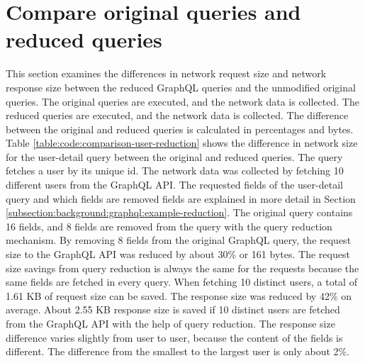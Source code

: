 \section{Compare original queries and reduced queries}

This section examines the differences in network request size and network response size between the reduced GraphQL queries and the unmodified original queries. The original queries are executed, and the network data is collected. The reduced queries are executed, and the network data is collected. The difference between the original and reduced queries is calculated in percentages and bytes. Table \ref{table:code:comparison-user-reduction} shows the difference in network size for the user-detail query between the original and reduced queries. The query fetches a user by its unique id. The network data was collected by fetching 10 different users from the GraphQL \ac{API}. The requested fields of the user-detail query and which fields are removed fields are explained in more detail in Section \ref{subsection:background:graphql:example-reduction}. The original query contains 16 fields, and 8 fields are removed from the query with the query reduction mechanism. By removing 8 fields from the original GraphQL query, the request size to the GraphQL \ac{API} was reduced by about 30\% or 161 bytes. The request size savings from query reduction is always the same for the requests because the same fields are fetched in every query. When fetching 10 distinct users, a total of 1.61 KB of request size can be saved. The response size was reduced by 42\% on average. About 2.55 KB response size is saved if 10 distinct users are fetched from the GraphQL \ac{API} with the help of query reduction. The response size difference varies slightly from user to user, because the content of the fields is different. The difference from the smallest to the largest user is only about 2\%.

